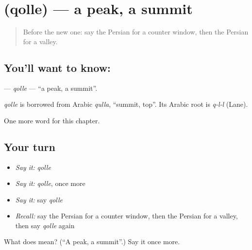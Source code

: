 \section[\texorpdfstring{\fa{قله} (qolle)}{قله (qolle)}]{ (qolle) — a peak, a summit}

\label{lesson:FA-C194-qolle}



\begin{quote}
Before the new one: say the Persian for a counter window, then the Persian for a valley.
\end{quote}

\subsection*{You'll want to know: }
\textbf{} — \emph{qolle} — \textquotedblleft{}a peak, a summit\textquotedblright{}.

\begin{cousinweb}
\emph{qolle} is borrowed from Arabic \emph{qulla}, \textquotedblleft{}summit, top\textquotedblright{}. Its Arabic root is \emph{q-l-l} (Lane).
\end{cousinweb}

\begin{grammarlens}[title={What you've built}]
One more word for this chapter.
\end{grammarlens}

\subsection*{Your turn}
\begin{itemize}
\raggedright
  \item \emph{Say it:} \emph{qolle}
  \item \emph{Say it:} \emph{qolle}, once more
  \item \emph{Say it:} say \emph{qolle}
  \item \emph{Recall:} say the Persian for a counter window, then the Persian for a valley, then say \emph{qolle} again
\end{itemize}

\begin{tcolorbox}[breakable,colback=teal!4,colframe=teal!35!black,title={Before you move on}]
What does  mean? (\textquotedblleft{}A peak, a summit\textquotedblright{}.) Say it once more.
\end{tcolorbox}
